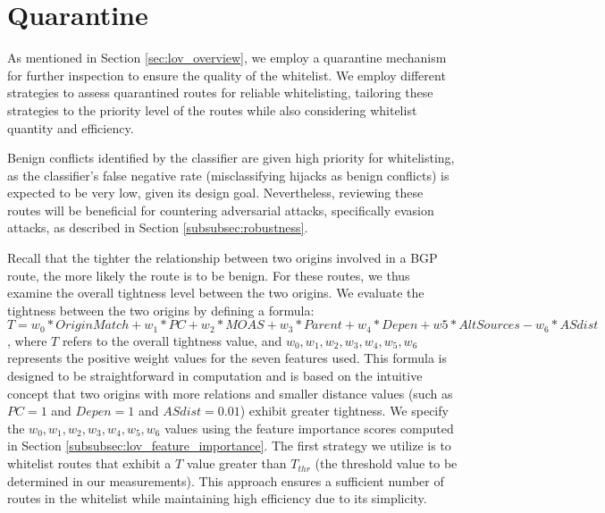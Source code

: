 \section{Quarantine} \label{subsec:quarantine}
As mentioned in Section \ref{sec:lov_overview}, we employ a quarantine mechanism for further inspection to ensure the quality of the whitelist.
We employ different strategies to assess quarantined routes for reliable whitelisting, tailoring these strategies to the priority level of the routes while also considering whitelist quantity and efficiency. 

Benign conflicts identified by the classifier are given high priority for whitelisting, as the classifier's false negative rate (misclassifying hijacks as benign conflicts) is expected to be very low, given its design goal. Nevertheless, reviewing these routes will be beneficial for countering adversarial attacks, specifically evasion attacks, as described in Section \ref{subsubsec:robustness}.

Recall that the tighter the relationship between two origins involved in a BGP route, the more likely the route is to be benign.
For these routes, we thus examine the overall tightness level between the two origins. We evaluate the tightness between the two origins by defining a formula: {$T = w_{0}*OriginMatch + w_{1}*PC + w_{2}*MOAS + w_{3}*Parent + w_{4}*Depen + w{5}*AltSources - w_{6}*ASdist$}, where $T$ refers to the overall tightness value, and $w_{0}, w_{1}, w_{2}, w_{3}, w_{4}, w_{5}, w_{6}$ represents the positive weight values for the seven features used.
This formula is designed to be straightforward in computation and is based on the intuitive concept that two origins with more relations and smaller distance values (such as $PC = 1$ and $Depen = 1$ and $ASdist = 0.01$) exhibit greater tightness.
We specify the $w_{0}, w_{1}, w_{2}, w_{3}, w_{4}, w_{5}, w_{6}$ values using the feature importance scores computed in Section \ref{subsubsec:lov_feature_importance}.
The first strategy we utilize is to whitelist routes that exhibit a $T$ value greater than $T_{thr}$ (the threshold value to be determined in our measurements).
This approach ensures a sufficient number of routes in the whitelist while maintaining high efficiency due to its simplicity.

